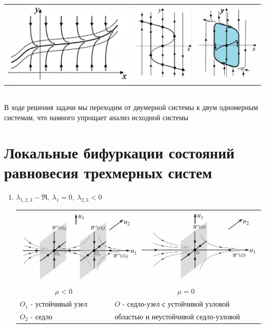 \begin{multicols*}{2}
		\begin{tabular}{c | c}
			{\includegraphics[width=0.45\linewidth]{tk_img/sbmd_2.png}} & {\includegraphics[width=0.45\linewidth]{tk_img/sbmd.png}}
		\end{tabular}\\
		В ходе решения задачи мы переходим от двумерной системы к двум одномерным системам, что намного упрощает анализ  исходной системы
		
		\section{Локальные бифуркации состояний равновесия трехмерных систем}
		\begin{enumerate} 
			\item $\lambda_{1,2,3} - \Re,\ \lambda_1=0,\ \lambda_{2,3}<0$ \\
			\begin{tabular*}{0.5\textwidth}{@{\extracolsep{\fill}}ll}
				\multicolumn{2}{l}{\includegraphics[width=0.9\linewidth]{tk_img/14_1.png}} \\               
				\multicolumn{1}{c}{$\mu<0$} & \multicolumn{1}{c}{$\mu=0$} \\
				$O_1$ - устойчивый узел & $O$ - седло-узел с устойчивой узловой  \\
				$O_2$ - седло & областью и неустойчивой седло-узловой
			\end{tabular*}
			

\end{enumerate}
\end{multicols*}
